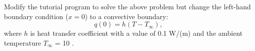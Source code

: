 Modify the tutorial program to solve the above problem but change the left-hand boundary condition ($x=0$) to a convective boundary:
\begin{equation*}
	q(0) = h (T - T_{\infty}),
\end{equation*}
where $h$ is heat transfer coefficient with a value of 0.1 W/(\C m) and the ambient temperature $T_{\infty}$ = 10 \C .


